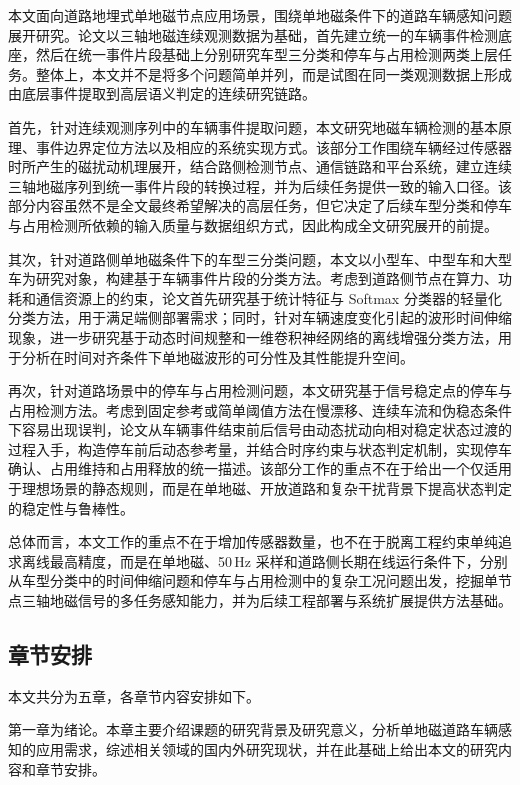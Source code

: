 \documentclass{xdupgthesis}
\begin{document}
本文面向道路地埋式单地磁节点应用场景，围绕单地磁条件下的道路车辆感知问题展开研究。论文以三轴地磁连续观测数据为基础，首先建立统一的车辆事件检测底座，然后在统一事件片段基础上分别研究车型三分类和停车与占用检测两类上层任务。整体上，本文并不是将多个问题简单并列，而是试图在同一类观测数据上形成由底层事件提取到高层语义判定的连续研究链路。

首先，针对连续观测序列中的车辆事件提取问题，本文研究地磁车辆检测的基本原理、事件边界定位方法以及相应的系统实现方式。该部分工作围绕车辆经过传感器时所产生的磁扰动机理展开，结合路侧检测节点、通信链路和平台系统，建立连续三轴地磁序列到统一事件片段的转换过程，并为后续任务提供一致的输入口径。该部分内容虽然不是全文最终希望解决的高层任务，但它决定了后续车型分类和停车与占用检测所依赖的输入质量与数据组织方式，因此构成全文研究展开的前提。

其次，针对道路侧单地磁条件下的车型三分类问题，本文以小型车、中型车和大型车为研究对象，构建基于车辆事件片段的分类方法。考虑到道路侧节点在算力、功耗和通信资源上的约束，论文首先研究基于统计特征与 Softmax 分类器的轻量化分类方法，用于满足端侧部署需求；同时，针对车辆速度变化引起的波形时间伸缩现象，进一步研究基于动态时间规整和一维卷积神经网络的离线增强分类方法，用于分析在时间对齐条件下单地磁波形的可分性及其性能提升空间。

再次，针对道路场景中的停车与占用检测问题，本文研究基于信号稳定点的停车与占用检测方法。考虑到固定参考或简单阈值方法在慢漂移、连续车流和伪稳态条件下容易出现误判，论文从车辆事件结束前后信号由动态扰动向相对稳定状态过渡的过程入手，构造停车前后动态参考量，并结合时序约束与状态判定机制，实现停车确认、占用维持和占用释放的统一描述。该部分工作的重点不在于给出一个仅适用于理想场景的静态规则，而是在单地磁、开放道路和复杂干扰背景下提高状态判定的稳定性与鲁棒性。

总体而言，本文工作的重点不在于增加传感器数量，也不在于脱离工程约束单纯追求离线最高精度，而是在单地磁、50\,Hz 采样和道路侧长期在线运行条件下，分别从车型分类中的时间伸缩问题和停车与占用检测中的复杂工况问题出发，挖掘单节点三轴地磁信号的多任务感知能力，并为后续工程部署与系统扩展提供方法基础。

\subsection{章节安排}
\label{sec:thesis_organization}

本文共分为五章，各章节内容安排如下。

第一章为绪论。本章主要介绍课题的研究背景及研究意义，分析单地磁道路车辆感知的应用需求，综述相关领域的国内外研究现状，并在此基础上给出本文的研究内容和章节安排。
\end{document}
